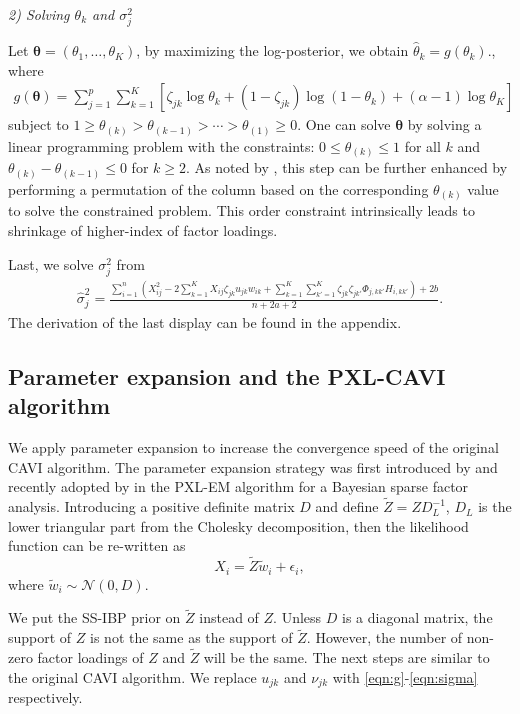 \documentclass[pdftex]{imsart}
\theoremstyle{plain}
\begin{document}
{\it 2) Solving $\theta_k$ and $\sigma_j^2$}

Let $\boldsymbol \theta = (\theta_1, \dots, \theta_K)$, by maximizing the log-posterior, we obtain $\hat\theta_k = g(\theta_k).$,
where 
\begin{align}
\label{eqn:theta}
g(\boldsymbol \theta) = \sum_{j=1}^p \sum_{k=1}^{K} 
\left[
\zeta_{jk} \log \theta_k + (1 - \zeta_{jk}) \log (1 - \theta_{k}) + (\alpha - 1) \log \theta_{K}
\right]
\end{align}
subject to $1 \geq \theta_{(k)} > \theta_{(k-1)} > \cdots > \theta_{(1)} \geq 0$.
One can solve $\boldsymbol \theta$ by solving a linear programming problem with the constraints:
$0 \leq \theta_{(k)} \leq 1$ for all $k$ and $\theta_{(k)} - \theta_{(k-1)} \leq 0$ for $k \geq 2$. As noted by \citet{rockova16}, this step can be further enhanced by performing a permutation of the column based on the corresponding $\theta_{(k)}$ value to solve the constrained problem. This order constraint intrinsically leads to shrinkage of higher-index of factor loadings. 

Last, we solve $\sigma_j^2$ from
\begin{align}
\label{eqn:sigma}
\hat \sigma_j^2 = \frac{
\sum_{i=1}^n \left( X_{ij}^2 - 2 \sum_{k=1}^K X_{ij} \zeta_{jk} u_{jk} w_{ik} 
+ \sum_{k=1}^K \sum_{k' = 1}^K \zeta_{jk} \zeta_{jk'} \Phi_{j,kk'} H_{i, kk'}\right) + 2b 
}{n + 2a + 2}.
\end{align}
The derivation of the last display can be found in the appendix. 

\subsection{Parameter expansion and the PXL-CAVI algorithm}

We apply parameter expansion to increase the convergence speed of the original CAVI algorithm. 
The parameter expansion strategy was first introduced by \citet{liu98} and recently adopted by \citet{rockova16} in the PXL-EM algorithm for a Bayesian sparse factor analysis. 
Introducing a positive definite matrix $D$ and define $\tilde Z = Z D_L^{-1}$, $D_L$ is the lower triangular part from the Cholesky decomposition, then the likelihood function can be re-written as 
$$
X_i = \tilde Z \tilde w_i + \epsilon_i, 
$$
where $\tilde w_i \sim \mathcal{N}(0, D)$. 

We put the SS-IBP prior on $\tilde Z$ instead of $Z$. Unless $D$ is a diagonal matrix, the support of $Z$ is not the same as the support of $\tilde Z$. However, the number of non-zero factor loadings of $Z$ and $\tilde Z$ will be the same. 
The next steps are similar to the original CAVI algorithm. We replace $u_{jk}$ and $\nu_{jk}$ with \eqref{eqn:g}-\eqref{eqn:sigma} respectively. 
\end{document}
